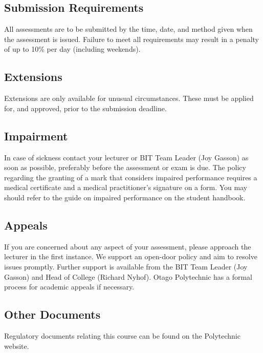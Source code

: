 \documentclass{article}
\begin{document}
\subsection*{Submission Requirements}
All assessments are to be submitted by the time, date, and method given when the assessment is issued. Failure to meet all requirements may result in a penalty of up to 10\% per day (including weekends).

\subsection*{Extensions}
Extensions are only available for unusual circumstances. These must be applied for, and approved, prior to the submission deadline.

\subsection*{Impairment}
In case of sickness contact your lecturer or BIT Team Leader (Joy Gasson) as soon as possible, preferably before the assessment or exam is due. The policy regarding the granting of a mark that considers impaired performance requires a medical certificate and a medical practitioner’s signature on a form. You may should refer to the guide on impaired performance on the student handbook.

\subsection*{Appeals}
If you are concerned about any aspect of your assessment, please approach the lecturer in the first instance. We support an open-door policy and aim to resolve issues promptly. Further support is available from the BIT Team Leader (Joy Gasson) and Head of College (Richard Nyhof). Otago Polytechnic has a formal process for academic appeals if necessary.

\subsection*{Other Documents}
Regulatory documents relating this course can be found on the Polytechnic website.
\end{document}

